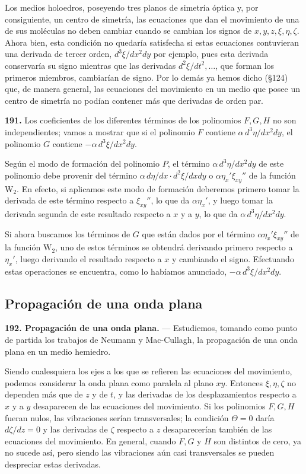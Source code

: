 Los medios holoedros, poseyendo tres planos de simetría óptica y, por
consiguiente, un centro de simetría, las ecuaciones que dan el movimiento
de una de sus moléculas no deben cambiar cuando se cambian los signos de
$x,y,z,\xi,\eta,\zeta$. Ahora bien, esta condición no quedaría satisfecha
si estas ecuaciones contuvieran una derivada de tercer orden,
$d^3\xi/dx^2dy$ por ejemplo, pues esta derivada conservaría su signo
mientras que las derivadas $d^2\xi/dt^2,\dots$, que forman los primeros
miembros, cambiarían de signo. Por lo demás ya hemos dicho (§124) que, de
manera general, las ecuaciones del movimiento en un medio que posee un
centro de simetría no podían contener más que derivadas de orden par.

\noindent\textbf{191.} Los coeficientes de los diferentes términos de los
polinomios $F,G,H$ no son independientes; vamos a mostrar que si el
polinomio $F$ contiene $\alpha\,d^3\eta/dx^2dy$, el polinomio $G$ contiene
$-\alpha\,d^3\xi/dx^2dy$.

Según el modo de formación del polinomio $P$, el término
$\alpha\,d^3\eta/dx^2dy$ de este polinomio debe provenir del término
$\alpha\,d\eta/dx\cdot d^2\xi/dxdy$ o $\alpha\eta_x'\xi_{xy}''$ de la
función $\mathrm{W}_2$. En efecto, si aplicamos este modo de formación deberemos
primero tomar la derivada de este término respecto a $\xi_{xy}''$, lo que
da $\alpha\eta_x'$, y luego tomar la derivada segunda de este resultado
respecto a $x$ y a $y$, lo que da $\alpha\,d^3\eta/dx^2dy$.

Si ahora buscamos los términos de $G$ que están dados por el término
$\alpha\eta_x'\xi_{xy}''$ de la función $\mathrm{W}_2$, uno de estos términos se
obtendrá derivando primero respecto a $\eta_x'$, luego derivando el
resultado respecto a $x$ y cambiando el signo. Efectuando estas
operaciones se encuentra, como lo habíamos anunciado, $-\alpha\,d^3\xi/dx^2dy$.

\subsection{Propagación de una onda plana}

\noindent\textbf{192. Propagación de una onda plana.} — Estudiemos,
tomando como punto de partida los trabajos de Neumann y Mac-Cullagh, la
propagación de una onda plana en un medio hemiedro.

Siendo cualesquiera los ejes a los que se refieren las ecuaciones del
movimiento, podemos considerar la onda plana como paralela al plano $xy$.
Entonces $\xi,\eta,\zeta$ no dependen más que de $z$ y de $t$, y las
derivadas de los desplazamientos respecto a $x$ y a $y$ desaparecen de
las ecuaciones del movimiento. Si los polinomios $F,G,H$ fueran nulos, las
vibraciones serían transversales; la condición $\Theta=0$ daría
$d\zeta/dz=0$ y las derivadas de $\zeta$ respecto a $z$ desaparecerían
también de las ecuaciones del movimiento. En general, cuando $F,G$ y $H$
son distintos de cero, ya no sucede así, pero siendo las vibraciones aún
casi transversales se pueden despreciar estas derivadas.

